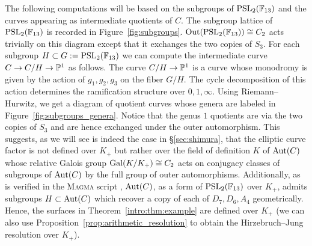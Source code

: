 \documentclass[main.tex]{subfiles}
\begin{document}
The following computations will be based on the subgroups of $\PSL_2(\FF_{13})$ and the curves appearing as intermediate quotients of $C$. The subgroup lattice of $\PSL_2(\FF_{13})$ is recorded in Figure~\ref{fig:subgroups}. $\mathrm{Out}(\PSL_2(\FF_{13})) \cong C_2$ acts trivially on this diagram except that it exchanges the two copies of $S_3$. For each subgroup $H \subset G := \PSL_2(\FF_{13})$ we can compute the intermediate curve $C \to C / H \to \P^1$ as follows. The curve $C / H \to \P^1$ is a \Belyi curve whose monodromy is given by the action of $g_1, g_2, g_3$ on the fiber $G/H$. The cycle decomposition of this action determines the ramification structure over $0,1,\infty$. Using Riemann--Hurwitz, we get a diagram of quotient curves whose genera are labeled in Figure~\ref{fig:subgroups_genera}. Notice that the genus $1$ quotients are via the two copies of $S_3$ and are hence exchanged under the outer automorphism. This suggests, as we will see is indeed the case in \S\ref{sec:shimura}, that the elliptic curve factor is not defined over $K_+$ but rather over the field of definition $K$ of $\Aut(C)$ whose relative Galois group $\Gal(K / K_+) \cong C_2$ acts on conjugacy classes of subgroups of $\Aut(C)$ by the full group of outer automorphisms. Additionally, as is verified in the \textsc{Magma} script \cite[\texttt{subgroup\_schemes.m}]{church:github}, $\Aut(C)$, as a form of $\PSL_2(\FF_{13})$ over $K_+$, admits subgroups $H \subset \Aut(C)$ which recover a copy of each of $D_7, D_6, A_4$ geometrically. Hence, the surfaces in Theorem~\ref{intro:thm:example} are defined over $K_+$ (we can also use Proposition~\ref{prop:arithmetic_resolution} to obtain the Hirzebruch--Jung resolution over $K_+$).
\end{document}
